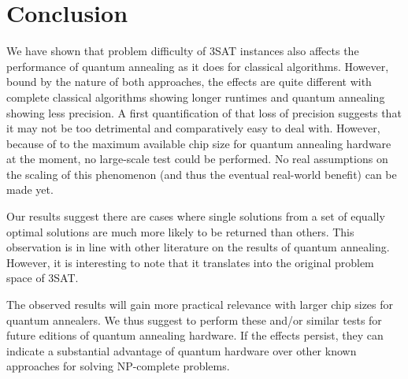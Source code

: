 \section{Conclusion}
\label{sec:conclusion}


We have shown that problem difficulty of 3SAT instances also affects the performance of quantum annealing as it does for classical algorithms. However, bound by the nature of both approaches, the effects are quite different with complete classical algorithms showing longer runtimes and quantum annealing showing less precision. A first quantification of that loss of precision suggests that it may not be too detrimental and comparatively easy to deal with. However, because of to the maximum available chip size for quantum annealing hardware at the moment, no large-scale test could be performed. No real assumptions on the scaling of this phenomenon (and thus the eventual real-world benefit) can be made yet.

Our results suggest there are cases where single solutions from a set of equally optimal solutions are much more likely to be returned than others. This observation is in line with other literature on the results of quantum annealing. However, it is interesting to note that it translates into the original problem space of 3SAT.

The observed results will gain more practical relevance with larger chip sizes for quantum annealers. We thus suggest to perform these and/or similar tests for future editions of quantum annealing hardware. If the effects persist, they can indicate a substantial advantage of quantum hardware over other known approaches for solving NP-complete problems.
